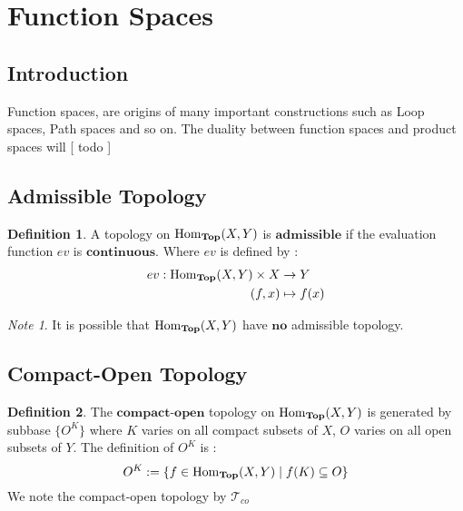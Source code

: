 \documentclass[a4paper]{article}
\theoremstyle{plain}
\theoremstyle{definition}
\newtheorem{defn}{Definition}[section]
\theoremstyle{remark}
\newtheorem*{note}{Note}
\newcommand{\setsubsectcounter}[1]{\setcounter{subsection}{#1}}
\newcommand{\mc}[1]{\mathcal{#1}}
\newcommand{\mbf}[1]{\mathbf{#1}}
\newcommand{\mcT}{\mc T}
\DeclareMathOperator{\Homtop}{\rm{Hom}_{\mbf{Top}}}
\begin{document}
    \section{Function Spaces}

    \setsubsectcounter{-1}

    \subsection{Introduction}

    Function spaces, are origins of many important constructions such as
    Loop spaces, Path spaces and so on.
    The duality between function spaces and product spaces will [ todo ]

    \subsection{Admissible Topology}

    \begin{defn}
        A topology on $\Homtop(X, Y)$ is $\mbf{admissible}$ if 
        the evaluation function $ev$ is $\mbf{continuous}$. Where $ev$ is defined by : 
        \begin{align*}
            ev  : \Homtop(X,Y) \times X & \to Y \\
            (f, x)& \mapsto f(x)
        \end{align*}
    \end{defn}

    \begin{note}
        It is possible that $\Homtop(X,Y)$ have $\mbf{no}$ admissible topology.
    \end{note}

    \subsection{Compact-Open Topology}

    \begin{defn}
        The $\mbf{compact\text{-}open}$ topology on $\Homtop(X,Y)$ is generated by 
        subbase $\{O^K\}$ where $K$ varies on all compact subsets of $X$, 
        $O$ varies on all open subsets of $Y$. 
        The definition of $O^K$ is :
        $$ O^K := \{ f \in \Homtop(X,Y) \mid f(K) \subseteq O \} $$
        We note the compact-open topology by $\mcT_{co}$
    \end{defn}
\end{document}
